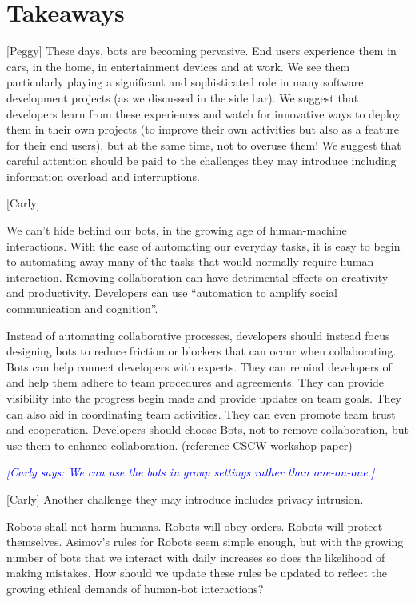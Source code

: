 \documentclass{sig-alternate}
\newcommand{\cl}[1]{\textcolor{blue}{{\it [Carly says: #1]}}}
\begin{document}
\section{Takeaways}

	[Peggy]
	These days, bots are becoming pervasive.  End users experience them in cars, in the home, in entertainment devices and at work.  We see them particularly playing a significant and sophisticated role in many software development projects (as we discussed in the side bar).  
	We suggest that developers learn from these experiences and watch for innovative ways to deploy them in their own projects (to improve their own activities but also as a feature for their end users), but at the same time, not to overuse them! 
	We suggest that careful attention should be paid to the challenges they may introduce including information overload and interruptions.  
	
	
	[Carly]

	We can't hide behind our bots, in the growing age of human-machine interactions.  With the ease of automating our everyday tasks, it is easy to begin to automating away many of the tasks that would normally require human interaction. Removing collaboration can have detrimental effects on creativity and productivity. Developers can use ``automation to amplify social communication and cognition''.

	Instead of automating collaborative processes, developers should instead focus designing bots to reduce friction or blockers that can occur when collaborating. Bots can help connect developers with experts. They can remind developers of and help them adhere to team procedures and agreements. They can provide visibility into the progress begin made and provide updates on team goals. They can also aid in coordinating team activities. They can even promote team trust and cooperation. Developers should choose Bots, not to remove collaboration, but use them to enhance collaboration. (reference CSCW workshop paper)

	\cl{We can use the bots in group settings rather than one-on-one.}

	[Carly]
	Another challenge they may introduce includes privacy intrusion. 

	Robots shall not harm humans. Robots will obey orders. Robots will protect themselves.  Asimov's rules for Robots \cite{asimov1950evitable} seem simple enough, but with the growing number of bots that we interact with daily increases so does the likelihood of making mistakes. How should we update these rules be updated to reflect the growing ethical demands of human-bot interactions?
\end{document}
